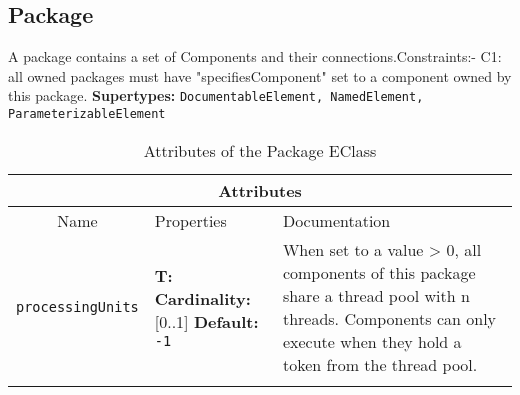 \documentclass{article}
\begin{document}
\subsection[Package]{Package}
\label{e4smPackage}

A package contains a set of Components and their connections.Constraints:- C1: all owned packages must have "specifiesComponent" set to a component owned by this package.
\textbf{Supertypes: }\texttt{DocumentableElement, NamedElement, ParameterizableElement}
\begin{table}[H]
\footnotesize
\begin{tabularx}{\textwidth}{|c| p{4 cm} | X |}
\hline
\multicolumn{3}{|c|}{\textbf{Attributes}} \\
\hline
Name & Properties & Documentation \\ \hline \hline
\texttt{processingUnits}
 & 
\textbf{T:} \texttt{}
\newline
\textbf{Cardinality:} [0..1]
\newline
\textbf{Default:} \texttt{-1}
 & When set to a value > 0, all components of this package share a thread pool with n threads. Components can only execute when they hold a token from the thread pool.\\ \hline
\caption{Attributes of the Package EClass}
\end{tabularx}
\label{e4smPackageattr}
\end{table}
\end{document}
